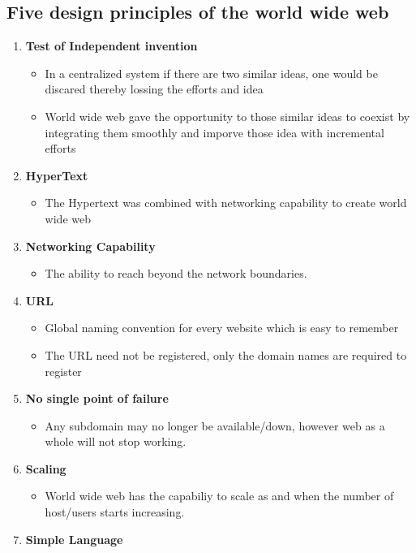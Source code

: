 \documentclass{resources/WeSTassignment}
\begin{document}
\begin{enumerate}
\subsection{Five design principles of the world wide web}
\begin{enumerate}
    \item \textbf{Test of Independent invention}
	\begin{itemize}
    		\item In a centralized system if there are two similar ideas, one would be discared thereby lossing the efforts and idea
		\item World wide web gave the opportunity to those similar ideas to coexist by integrating them smoothly and imporve those idea with incremental efforts
	\end{itemize}
    \item \textbf{HyperText}
	\begin{itemize}
    		\item The Hypertext was combined with networking capability to create world wide web
	\end{itemize}
    \item \textbf{Networking Capability}
	\begin{itemize}
    		\item The ability to reach beyond the network boundaries.
	\end{itemize}
    \item \textbf{URL}
	\begin{itemize}
    		\item Global naming convention for every website which is easy to remember
		\item The URL need not be registered, only the domain names are required to register
	\end{itemize}
    \item \textbf{No single point of failure}
	\begin{itemize}
    		\item Any subdomain may no longer be available/down, however web as a whole will not stop working.
	\end{itemize}
    \item \textbf{Scaling}
	\begin{itemize}
    		\item World wide web has the capabiliy to scale as and when the number of host/users starts increasing.
	\end{itemize}
    \item \textbf{Simple Language}

\end{enumerate}
\end{enumerate}
\end{document}
